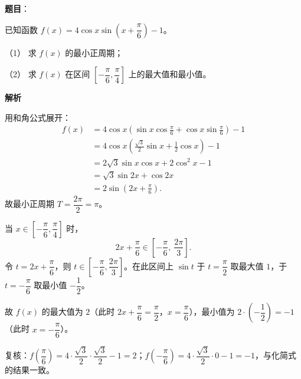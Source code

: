 \begin{answer}

\textbf{题目}：

已知函数 $f(x)=4\cos x\sin\left(x+\dfrac{\pi}{6}\right)-1$。

（1） 求 $f(x)$ 的最小正周期；

（2） 求 $f(x)$ 在区间 $\left[-\dfrac{\pi}{6},\dfrac{\pi}{4}\right]$ 上的最大值和最小值。

\textbf{解析}


用和角公式展开：
\nopagebreak[4]
\[
\begin{aligned}
f(x)&=4\cos x\left(\sin x\cos\frac{\pi}{6}+\cos x\sin\frac{\pi}{6}\right)-1\\
&=4\cos x\left(\frac{\sqrt3}{2}\sin x+\frac12\cos x\right)-1\\
&=2\sqrt3\sin x\cos x+2\cos^2x-1\\
&=\sqrt3\sin2x+\cos2x\\
&=2\sin\left(2x+\frac{\pi}{6}\right).
\end{aligned}
\]
故最小正周期 $T=\dfrac{2\pi}{2}=\pi$。


当 $x\in\left[-\dfrac{\pi}{6},\dfrac{\pi}{4}\right]$ 时，
\nopagebreak[4]
\[
2x+\frac{\pi}{6}\in\left[-\frac{\pi}{6},\ \frac{2\pi}{3}\right].
\]
令 $t=2x+\dfrac{\pi}{6}$，则 $t\in\left[-\dfrac{\pi}{6},\dfrac{2\pi}{3}\right]$。在此区间上 $\sin t$ 于 $t=\dfrac{\pi}{2}$ 取最大值 $1$，于 $t=-\dfrac{\pi}{6}$ 取最小值 $-\dfrac12$。

故 $f(x)$ 的最大值为 $2$（此时 $2x+\dfrac{\pi}{6}=\dfrac{\pi}{2}$，$x=\dfrac{\pi}{6}$），最小值为 $2\cdot\left(-\dfrac12\right)=-1$（此时 $x=-\dfrac{\pi}{6}$）。

复核：$f\left(\dfrac{\pi}{6}\right)=4\cdot\dfrac{\sqrt3}{2}\cdot\dfrac{\sqrt3}{2}-1=2$；$f\left(-\dfrac{\pi}{6}\right)=4\cdot\dfrac{\sqrt3}{2}\cdot0-1=-1$，与化简式的结果一致。



\end{answer}
